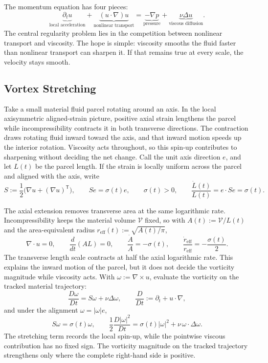 
The momentum equation has four pieces:
\[
  \underbrace{\partial_t u}_{\text{local acceleration}}
  +
  \underbrace{(u\cdot\nabla)u}_{\text{nonlinear transport}}
  =
  \underbrace{-\nabla p}_{\text{pressure}}
  +
  \underbrace{\nu\Delta u}_{\text{viscous diffusion}}.
\]
The central regularity problem lies in the competition between nonlinear transport and viscosity.
The hope is simple: viscosity smooths the fluid faster than nonlinear transport can sharpen it.
If that remains true at every scale, the velocity stays smooth.

\subsection{Vortex Stretching}\label{sub:ThePerfectlyStretchingVortex}

Take a small material fluid parcel rotating around an axis. In the local axisymmetric aligned-strain picture, positive axial strain lengthens the parcel while incompressibility contracts it in both transverse directions. The contraction draws rotating fluid inward toward the axis, and that inward motion speeds up the interior rotation. Viscosity acts throughout, so this spin-up contributes to sharpening without deciding the net change. Call the unit axis direction \(e\), and let \(L(t)\) be the parcel length. If the strain is locally uniform across the parcel and aligned with the axis, write
\[
  S:=\frac12\bigl(\nabla u+(\nabla u)^{\mathsf T}\bigr),
  \qquad
  Se=\sigma(t)e,
  \qquad
  \sigma(t)>0,
  \qquad
  \frac{\dot L(t)}{L(t)}
  =
  e\cdot Se
  =
  \sigma(t).
\]

The axial extension removes transverse area at the same logarithmic rate. Incompressibility keeps the material volume \(\mathcal V\) fixed, so with \(A(t):=\mathcal V/L(t)\) and the area-equivalent radius \(r_{\mathrm{eff}}(t):=\sqrt{A(t)/\pi}\),
\[
  \nabla\cdot u=0,
  \qquad
  \frac{d}{dt}(A L)=0,
  \qquad
  \frac{\dot A}{A}=-\sigma(t),
  \qquad
  \frac{\dot r_{\mathrm{eff}}}{r_{\mathrm{eff}}}
  =
  -\frac{\sigma(t)}{2}.
\]
The transverse length scale contracts at half the axial logarithmic rate. This explains the inward motion of the parcel, but it does not decide the vorticity magnitude while viscosity acts. With \(\omega:=\nabla\times u\), evaluate the vorticity on the tracked material trajectory:
\[
  \frac{D\omega}{Dt}
  =
  S\omega+\nu\Delta\omega,
  \qquad
  \frac{D}{Dt}
  :=
  \partial_t+u\cdot\nabla,
\]
and under the alignment \(\omega=|\omega|e\),
\[
  S\omega
  =
  \sigma(t)\omega,
  \qquad
  \frac12\frac{D|\omega|^2}{Dt}
  =
  \sigma(t)|\omega|^2
  +
  \nu\,\omega\cdot\Delta\omega.
\]
The stretching term records the local spin-up, while the pointwise viscous contribution has no fixed sign. The vorticity magnitude on the tracked trajectory strengthens only where the complete right-hand side is positive.

